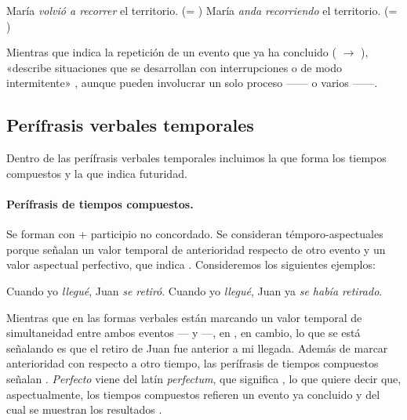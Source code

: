 \begin{exe}
  \ex
    \begin{xlist}
      \ex\label{ex:11-reit-a} María \textit{volvió a recorrer} el territorio. (=
          )
      \ex\label{ex:11-reit-b} María \textit{anda recorriendo} el territorio. (=
          )
    \end{xlist}
\end{exe}

Mientras que  indica la repetición de un evento que ya ha
concluido ( $\rightarrow$ ),  «describe situaciones que se desarrollan
con interrupciones o de modo intermitente» \parencite[§\,28.14a]{rae2025},
aunque pueden involucrar un solo proceso ------ o
varios ------.

\subsection{Perífrasis verbales temporales}\label{sec:11-temporales}

Dentro de las perífrasis verbales temporales incluimos la que forma los tiempos
compuestos y la que indica futuridad.

\paragraph{Perífrasis de tiempos compuestos.} Se forman con  +
participio no concordado. Se consideran témporo-aspectuales porque señalan un
valor temporal de anterioridad respecto de otro evento y un valor aspectual
perfectivo, que indica . Consideremos los
siguientes ejemplos:

\begin{exe}
  \ex
    \begin{xlist}
      \ex\label{ex:11-llegue-a} Cuando yo \textit{llegué}, Juan \textit{se
          retiró}.
      \ex\label{ex:11-llegue-b} Cuando yo \textit{llegué}, Juan ya \textit{se
          había retirado}.
    \end{xlist}
\end{exe}

Mientras que en  las formas verbales están marcando un
valor temporal de simultaneidad entre ambos eventos --- y ---, en , en cambio, lo que se está señalando es que
el retiro de Juan fue anterior a mi llegada. Además de marcar anterioridad con
respecto a otro tiempo, las perífrasis de tiempos compuestos señalan
. \textit{Perfecto} viene del latín
\textit{perfectum}, que significa , lo que quiere decir
que, aspectualmente, los tiempos compuestos refieren un evento ya concluido y del
cual se muestran los resultados \parencite{garciafernandez1998}.

